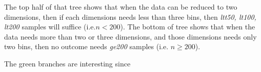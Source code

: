 The top half of that tree shows that when the data
can be reduced to two dimensions, then if each
dimensions needs less than three bins, then {\em
ltt50, lt100, lt200 } samples will suffice (i.e.$n<
200$).  The bottom of tree shows that when the data
needs more than two or three dimensions, and those
dimensions needs only two bins, then no outcome
needs {\em ge200} samples (i.e. $n\ge200$).

The green branches are interesting since 



      

